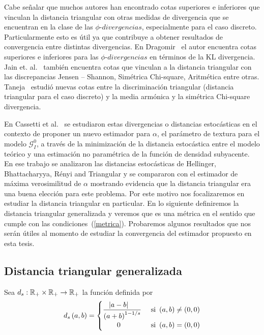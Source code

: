 Cabe señalar que muchos autores han encontrado cotas superiores e inferiores que vinculan la distancia triangular con otras medidas de divergencia que se encuentran en la clase de las $\phi \text{-} divergencias$, especialmente para el caso discreto. Particularmente esto es útil ya que contribuye a obtener resultados de convergencia entre distintas divergencias. En Dragomir~\cite{Dragomir2002} el autor encuentra cotas superiores e inferiores para las $\phi \text{-} divergencias$ en términos de la KL divergencia. Jain et. al.~\cite{JainSrivastava2007} también encuentra cotas que vinculan a la distancia triangular con las discrepancias Jensen – Shannon, Simétrica Chi-square, Aritmética entre otras. Taneja~\cite{Taneja2006} estudió nuevas cotas entre la discriminación triangular (distancia triangular para el caso discreto) y la media armónica y la simétrica Chi-square divergencia.

En Cassetti et al.~\cite{APSAR2013ParameterEstimationStochasticDistances} se estudiaron estas divergencias o distancias estocásticas en el contexto de proponer un nuevo estimador para $\alpha$, el parámetro de textura para el modelo $\mathcal{G}_I^0$, a través de la minimización de la distancia estocástica entre el modelo teórico y una estimación no paramétrica de la función de densidad subyacente. En ese trabajo se analizaron las distancias estocásticas de Hellinger, Bhattacharyya, R\'enyi and Triangular y se compararon con el estimador de máxima verosimilitud de $\alpha$ mostrando evidencia que la distancia triangular era una buena elección para este problema. Por este motivo nos focalizaremos en estudiar la distancia triangular en particular. En lo siguiente definiremos la distancia triangular generalizada y veremos que es una métrica en el sentido que cumple con las condiciones~(\ref{metrica}). Probaremos algunos resultados que nos serán útiles al momento de estudiar la convergencia del estimador propuesto en esta tesis.

\subsection{Distancia triangular generalizada}

Sea $d_{s}:\mathbb{R}_{+}\times\mathbb{R}_{+}\to\mathbb{R}_{+}$ la función definida por
\begin{align*}
d_{s}\left( a,b \right) = 
\begin{cases}
\dfrac{\left| a - b \right|\ \ \ }{\left( a + b \right)^{1-1/s}} & \text{ si } \left( a,b \right) \ne \left( 0,0 \right) \\
\qquad 0 &  \text{ si } \left( a,b \right) = \left( 0,0 \right)
\end{cases}
\end{align*}

